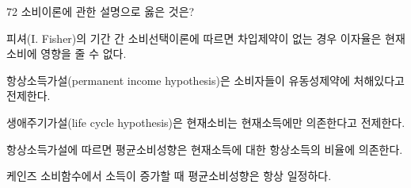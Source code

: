 \begin{question}{72}
소비이론에 관한 설명으로 옳은 것은?
\begin{choices}
  \item 피셔(I. Fisher)의 기간 간 소비선택이론에 따르면 차입제약이 없는 경우 이자율은 현재소비에 영향을 줄 수 없다.
  \item 항상소득가설(permanent income hypothesis)은 소비자들이 유동성제약에 처해있다고 전제한다.
  \item 생애주기가설(life cycle hypothesis)은 현재소비는 현재소득에만 의존한다고 전제한다.
  \item 항상소득가설에 따르면 평균소비성향은 현재소득에 대한 항상소득의 비율에 의존한다.
  \item 케인즈 소비함수에서 소득이 증가할 때 평균소비성향은 항상 일정하다.
\end{choices}
\end{question}

